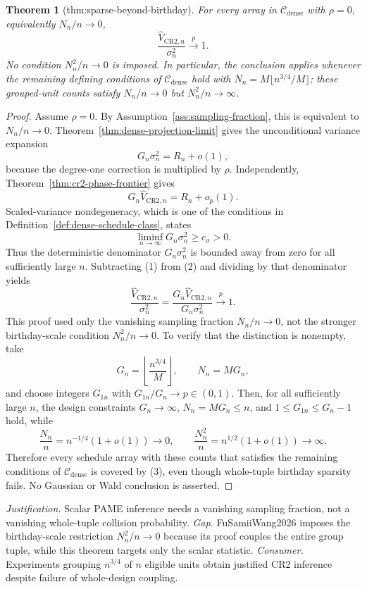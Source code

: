 \documentclass{article}
\newtheorem{theorem}{Theorem}
\begin{document}
\begin{theorem}[thm:sparse-beyond-birthday]\label{thm:sparse-beyond-birthday}
For every array in \(\mathcal C_{\mathrm{dense}}\) with \(\rho=0\), equivalently \(N_n/n\to0\),
\[
 \frac{\widehat V_{\mathrm{CR2},n}}{\sigma_n^2}\xrightarrow{p}1.
\]
No condition \(N_n^2/n\to0\) is imposed.  In particular, the conclusion applies whenever the remaining defining conditions of \(\mathcal C_{\mathrm{dense}}\) hold with \(N_n=M\lfloor n^{3/4}/M\rfloor\); these grouped-unit counts satisfy \(N_n/n\to0\) but \(N_n^2/n\to\infty\).
\end{theorem}
\begin{proof}
Assume \(\rho=0\).  By Assumption~\ref{ass:sampling-fraction}, this is equivalent to \(N_n/n\to0\).  Theorem~\ref{thm:dense-projection-limit} gives the unconditional variance expansion
\[
 G_n\sigma_n^2=R_n+o(1),
 \tag{1}
\]
because the degree-one correction is multiplied by \(\rho\).  Independently, Theorem~\ref{thm:cr2-phase-frontier} gives
\[
 G_n\widehat V_{\mathrm{CR2},n}=R_n+o_p(1).
 \tag{2}
\]
Scaled-variance nondegeneracy, which is one of the conditions in Definition~\ref{def:dense-schedule-class}, states
\[
 \liminf_{n\to\infty}G_n\sigma_n^2\ge c_\sigma>0.
\]
Thus the deterministic denominator \(G_n\sigma_n^2\) is bounded away from zero for all sufficiently large \(n\).  Subtracting (1) from (2) and dividing by that denominator yields
\[
 \frac{\widehat V_{\mathrm{CR2},n}}{\sigma_n^2}
 =\frac{G_n\widehat V_{\mathrm{CR2},n}}{G_n\sigma_n^2}
 \xrightarrow{p}1.
 \tag{3}
\]
This proof used only the vanishing sampling fraction \(N_n/n\to0\), not the stronger birthday-scale condition \(N_n^2/n\to0\).  To verify that the distinction is nonempty, take
\[
 G_n=\left\lfloor\frac{n^{3/4}}M\right\rfloor,
 \qquad
 N_n=MG_n,
\]
and choose integers \(G_{1n}\) with \(G_{1n}/G_n\to p\in(0,1)\).  Then, for all sufficiently large \(n\), the design constraints \(G_n\to\infty\), \(N_n=MG_n\le n\), and \(1\le G_{1n}\le G_n-1\) hold, while
\[
 \frac{N_n}{n}=n^{-1/4}(1+o(1))\to0,
 \qquad
 \frac{N_n^2}{n}=n^{1/2}(1+o(1))\to\infty.
\]
Therefore every schedule array with these counts that satisfies the remaining conditions of \(\mathcal C_{\mathrm{dense}}\) is covered by (3), even though whole-tuple birthday sparsity fails.  No Gaussian or Wald conclusion is asserted.
\end{proof}
\par\smallskip\noindent \textit{Justification.} Scalar PAME inference needs a vanishing sampling fraction, not a vanishing whole-tuple collision probability. \textit{Gap.} FuSamiiWang2026 imposes the birthday-scale restriction \(N_n^2/n\to0\) because its proof couples the entire group tuple, while this theorem targets only the scalar statistic. \textit{Consumer.} Experiments grouping \(n^{3/4}\) of \(n\) eligible units obtain justified CR2 inference despite failure of whole-design coupling.
\end{document}
